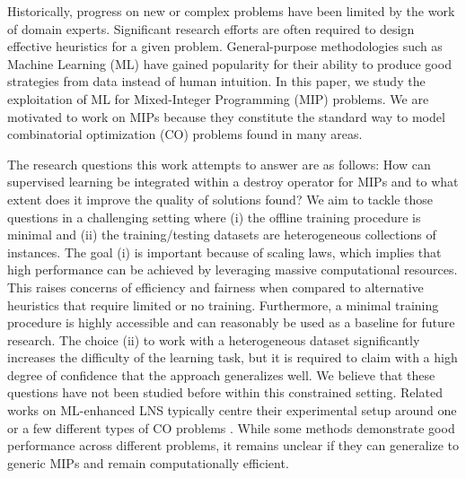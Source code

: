 \documentclass[3p, authoryear, times]{elsarticle}
\begin{document}
Historically, progress on new or complex problems have been limited by the work of domain experts.  Significant research efforts are often required to design effective heuristics for a given problem. General-purpose methodologies such as Machine Learning (ML) have gained popularity for their ability to produce good strategies from data instead of human intuition. In this paper, we study the exploitation of ML for Mixed-Integer Programming (MIP) problems. We are motivated to work on MIPs because they constitute the standard way to model combinatorial optimization (CO) problems found in many areas.  

The research questions this work attempts to answer are as follows: How can supervised learning be integrated within a destroy operator for MIPs and to what extent does it improve the quality of solutions found?  We aim to tackle those questions in a challenging setting where (i) the offline training procedure is minimal and (ii) the training/testing datasets are heterogeneous collections of instances. The goal (i) is important because of scaling laws, which implies that high performance can be achieved by leveraging massive computational resources. This raises concerns of efficiency and fairness when compared to alternative heuristics that require limited or no training. Furthermore, a minimal training procedure is highly accessible and can reasonably be used as a baseline for future research.   The choice (ii) to work with a heterogeneous dataset significantly increases the difficulty of the learning task, but it is required to claim with a high degree of confidence that the approach generalizes well.  We believe that these questions have not been studied before within this constrained setting. Related works on ML-enhanced LNS typically centre their experimental setup around one or a few different types of CO problems \citep{sonnerat_learning_2022, huang_searching_2023, liu_machine_2023, feijen_learning-enhanced_2024, la_rocca_combining_2024_fixed}. While some methods demonstrate good performance across different problems, it remains unclear if they can generalize to generic MIPs and remain computationally efficient. 
\end{document}
